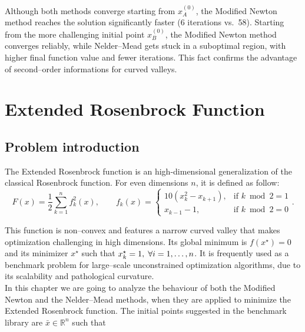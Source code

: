 \documentclass[a4paper,12pt]{article}
\begin{document}
	Although both methods converge starting from \( x^{(0)}_A \), the Modified Newton method reaches the solution significantly faster (6 iterations vs.\ 58). Starting from the more challenging initial point \( x^{(0)}_B \), the Modified Newton method converges reliably, while Nelder–Mead gets stuck in a suboptimal region, with higher final function value and fewer iterations. This fact confirms the advantage of second--order informations for curved valleys.
	
	

	
	\vspace{1em}
	
	
	\vspace{1em}
	
	
	 
	\newpage
	\section{Extended Rosenbrock Function}
	\subsection{Problem introduction}
	
	The Extended Rosenbrock function is an high-dimensional generalization of the classical Rosenbrock function. For even dimensions \( n \), it is defined as follow:
	\[
	F(x) = \frac{1}{2} \sum_{k=1}^{n} f_k^2(x), \qquad
	f_k(x) = 
	\begin{cases}
		10(x_k^2 - x_{k+1}), & \text{if } k \bmod 2 = 1 \\
		x_{k-1} - 1, & \text{if } k \bmod 2 = 0
	\end{cases}.
	\]
	
	This function is non--convex and features a narrow curved valley that makes optimization challenging in high dimensions. Its global minimum is \( f(x^\star) = 0 \) and its minimizer \( x^\star\) such that \( x^\star_{k} = 1, \hspace{0.1cm}\forall i = 1,\dots,n\). It is frequently used as a benchmark problem for large--scale unconstrained optimization algorithms, due to its scalability and pathological curvature.\\
	 
	In this chapter we are going to analyze the behaviour of both the Modified Newton and the Nelder–Mead methods, when they are applied to minimize the Extended Rosenbrock function. 
	The initial points suggested in the benchmark library  are $\bar{x} \in \mathbb{R}^{n}$ such that
\end{document}
